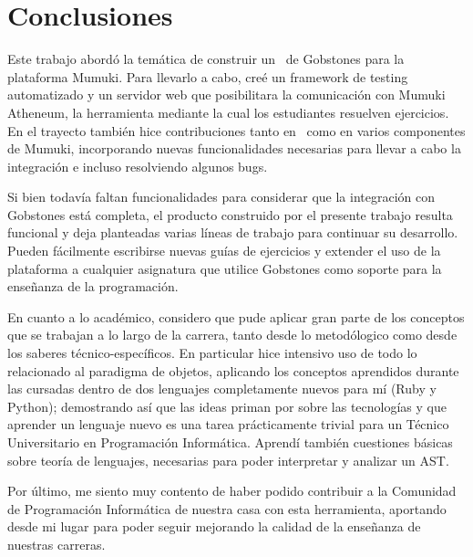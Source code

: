 
\section{Conclusiones}
Este trabajo abordó la temática de construir un \runner\ de Gobstones para la plataforma Mumuki. Para llevarlo a cabo, creé un framework de testing automatizado y un servidor web que posibilitara la comunicación con Mumuki Atheneum, la herramienta mediante la cual los estudiantes resuelven ejercicios. En el trayecto también hice contribuciones tanto en \pyGob\ como en varios componentes de Mumuki, incorporando nuevas funcionalidades necesarias para llevar a cabo la integración e incluso resolviendo algunos bugs.

Si bien todavía faltan funcionalidades para considerar que la integración con Gobstones está completa, el producto construido por el presente trabajo resulta funcional y deja planteadas varias líneas de trabajo para continuar su desarrollo. Pueden fácilmente escribirse nuevas guías de ejercicios y extender el uso de la plataforma a cualquier asignatura que utilice Gobstones como soporte para la enseñanza de la programación.

En cuanto a lo académico, considero que pude aplicar gran parte de los conceptos que se trabajan a lo largo de la carrera, tanto desde lo metodólogico como desde los saberes técnico-específicos. En particular hice intensivo uso de todo lo relacionado al paradigma de objetos, aplicando los conceptos aprendidos durante las cursadas dentro de dos lenguajes completamente nuevos para mí (Ruby y Python); demostrando así que las ideas priman por sobre las tecnologías y que aprender un lenguaje nuevo es una tarea prácticamente trivial para un Técnico Universitario en Programación Informática. Aprendí también cuestiones básicas sobre teoría de lenguajes, necesarias para poder interpretar y analizar un AST.

Por último, me siento muy contento de haber podido contribuir a la Comunidad de Programación Informática de nuestra casa con esta herramienta, aportando desde mi lugar para poder seguir mejorando la calidad de la enseñanza de nuestras carreras.
